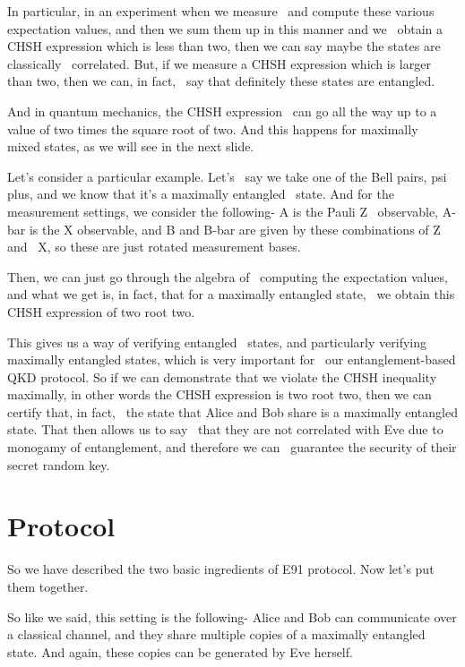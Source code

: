 In particular, in an experiment when we measure 
and compute these various expectation values,
and then we sum them up in this manner and we 
obtain a CHSH expression which is less than two,
then we can say maybe the states are classically 
correlated. But, if we measure a CHSH expression
which is larger than two, then we can, in fact, 
say that definitely these states are entangled.

And in quantum mechanics, the CHSH expression 
can go all the way up to a value of two times the
square root of two. And this happens for maximally 
mixed states, as we will see in the next slide.

Let's consider a particular example. Let's 
say we take one of the Bell pairs, psi plus,
and we know that it's a maximally entangled 
state. And for the measurement settings,
we consider the following- A is the Pauli Z 
observable, A-bar is the X observable, and B
and B-bar are given by these combinations of Z and 
X, so these are just rotated measurement bases.

Then, we can just go through the algebra of 
computing the expectation values, and what we get
is, in fact, that for a maximally entangled state, 
we obtain this CHSH expression of two root two.

This gives us a way of verifying entangled 
states, and particularly verifying maximally
entangled states, which is very important for 
our entanglement-based QKD protocol. So if we can
demonstrate that we violate the CHSH inequality 
maximally, in other words the CHSH expression is
two root two, then we can certify that, in fact, 
the state that Alice and Bob share is a maximally
entangled state. That then allows us to say 
that they are not correlated with Eve due
to monogamy of entanglement, and therefore we can 
guarantee the security of their secret random key.

\section{Protocol}


So we have described the two basic ingredients of E91 protocol. Now let's put them together.

So like we said, this setting is the following- Alice and Bob can communicate over a classical channel, and they share multiple copies of a maximally entangled state. And again, these copies can be generated by Eve herself.

